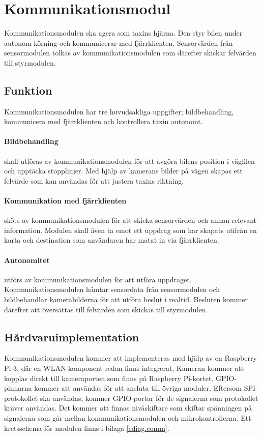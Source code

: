 \documentclass[designspec/spec.tex]{subfiles}
\begin{document}
\section{Kommunikationsmodul}
Kommunikationsmodulen ska agera som taxins hjärna. Den styr bilen under autonom
körning och kommunicerar med fjärrklienten. Sensorvärden från sensormodulen
tolkas av kommunikationsmodulen som därefter skickar felvärden till
styrmodulen.

\subsection{Funktion}
Kommunikationsmodulen har tre huvudsakliga uppgifter; bildbehandling,
kommunicera med fjärrklienten och kontrollera taxin autonomt.

\paragraph{Bildbehandling} skall utföras av kommunikationsmodulen för att
avgöra bilens position i vägfilen och upptäcka stopplinjer. Med hjälp av
kamerans bilder på vägen skapas ett felvärde som kan användas för att justera
taxins riktning.

\paragraph{Kommunikation med fjärrklienten} sköts av kommunikationsmodulen för
att skicka sensorvärden och annan relevant information. Modulen skall även ta
emot ett uppdrag som har skapats utifrån en karta och destination som
användaren har matat in via fjärrklienten.

\paragraph{Autonomitet} utförs av kommunikationsmodulen för att utföra
uppdraget. Kommunikationsmodulen hämtar sensordata från sensormodulen och
bildbehandlar kamerabilderna för att utföra beslut i realtid. Besluten kommer
därefter att översättas till felvärden som skickas till styrmodulen.

\subsection{Hårdvaruimplementation} 
Kommunikationsmodulen kommer att implementeras med hjälp av en Raspberry Pi 3,
där en WLAN-komponent redan finns integrerat. Kameran kommer att kopplas direkt
till kameraporten som finns på Raspberry Pi-kortet. GPIO-pinnarna kommer att
användas för att ansluta till övriga moduler.  Eftersom SPI-protokollet ska
användas, kommer GPIO-portar för de signalerna som protokollet kräver användas.
Det kommer att finnas nivåskiftare som skiftar spänningen på signalerna som går
mellan kommunikationsmodulen och mikrokontrollerna. Ett kretsschema för modulen
finns i bilaga \ref{cdiag.comm}.
\end{document}
